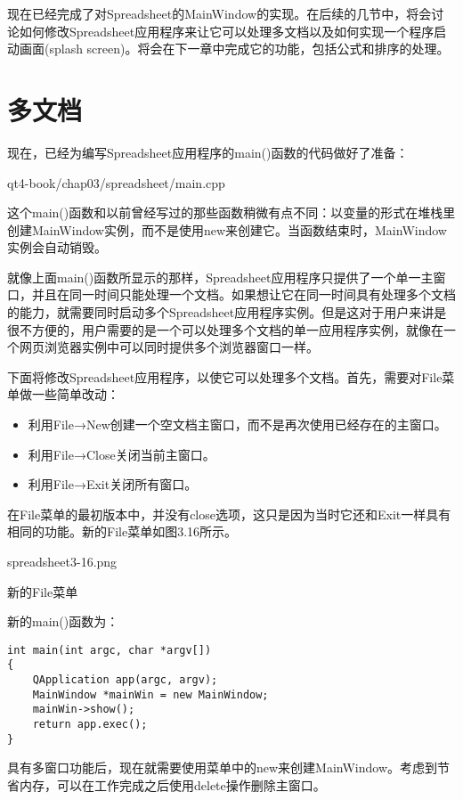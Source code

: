 \documentclass[11pt,oneside]{book}
\begin{document}
\begin{common-format}
现在已经完成了对Spreadsheet的MainWindow的实现。在后续的几节中，将会讨论如何修改Spreadsheet应用程序来让它可以处理多文档以及如何实现一个程序启动画面(splash screen)。将会在下一章中完成它的功能，包括公式和排序的处理。


\section{多文档}
现在，已经为编写Spreadsheet应用程序的main()函数的代码做好了准备：

\begin{cppinput}{qt4-book/chap03/spreadsheet/main.cpp}
\end{cppinput}


这个main()函数和以前曾经写过的那些函数稍微有点不同：以变量的形式在堆栈里创建MainWindow实例，而不是使用new来创建它。当函数结束时，MainWindow实例会自动销毁。

就像上面main()函数所显示的那样，Spreadsheet应用程序只提供了一个单一主窗口，并且在同一时间只能处理一个文档。如果想让它在同一时间具有处理多个文档的能力，就需要同时启动多个Spreadsheet应用程序实例。但是这对于用户来讲是很不方便的，用户需要的是一个可以处理多个文档的单一应用程序实例，就像在一个网页浏览器实例中可以同时提供多个浏览器窗口一样。

下面将修改Spreadsheet应用程序，以使它可以处理多个文档。首先，需要对File菜单做一些简单改动：
\begin{itemize}
\item 利用File→New创建一个空文档主窗口，而不是再次使用已经存在的主窗口。
\item 利用File→Close关闭当前主窗口。
\item 利用File→Exit关闭所有窗口。
\end{itemize}

在File菜单的最初版本中，并没有close选项，这只是因为当时它还和Exit一样具有相同的功能。新的File菜单如图3.16所示。
\begin{fig}{spreadsheet3-16.png}
\caption{新的File菜单}
\label{fig:spreadsheet3-16.png}
\end{fig}

新的main()函数为：
\begin{Verbatim}
int main(int argc, char *argv[])
{
    QApplication app(argc, argv);
    MainWindow *mainWin = new MainWindow;
    mainWin->show();
    return app.exec();
}
\end{Verbatim}


具有多窗口功能后，现在就需要使用菜单中的new来创建MainWindow。考虑到节省内存，可以在工作完成之后使用delete操作删除主窗口。


\end{common-format}
\end{document}
